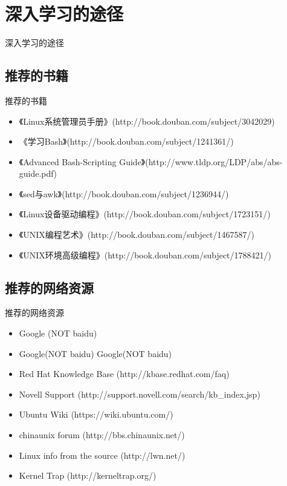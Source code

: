 \section{深入学习的途径}
\begin{frame}{深入学习的途径}
\tableofcontents[currentsection]
\end{frame}

\subsection{推荐的书籍}
\begin{frame}{推荐的书籍}
\begin{itemize}
\item 《Linux系统管理员手册》(http://book.douban.com/subject/3042029)
\item 《学习Bash》(http://book.douban.com/subject/1241361/)
\item 《Advanced Bash-Scripting Guide》(http://www.tldp.org/LDP/abs/abs-guide.pdf)
\item 《sed与awk》(http://book.douban.com/subject/1236944/)
\item 《Linux设备驱动编程》(http://book.douban.com/subject/1723151/)
\item 《UNIX编程艺术》(http://book.douban.com/subject/1467587/)
\item 《UNIX环境高级编程》(http://book.douban.com/subject/1788421/)
\end{itemize}
\end{frame}

\subsection{推荐的网络资源}
\begin{frame}{推荐的网络资源}
\begin{itemize}
\item Google (NOT baidu)
\item Google(NOT baidu)
\itme Google(NOT baidu)
\item Red Hat Knowledge Base (http://kbase.redhat.com/faq)
\item Novell Support (http://support.novell.com/search/kb\_index.jsp)
\item Ubuntu Wiki (https://wiki.ubuntu.com/)
\item chinaunix forum (http://bbs.chinaunix.net/)
\item Linux info from the source (http://lwn.net/)
\item Kernel Trap (http://kerneltrap.org/)
\end{itemize}
\end{frame}
